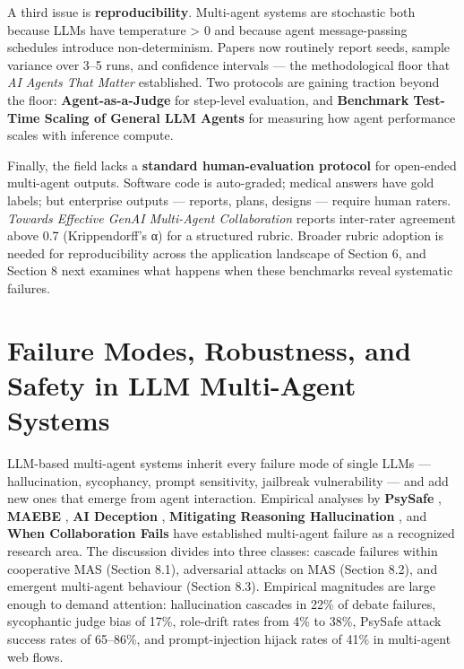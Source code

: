 \documentclass{article}
\begin{document}
A third issue is \textbf{reproducibility}. Multi-agent systems are stochastic both because LLMs have temperature \textgreater{} 0 and because agent message-passing schedules introduce non-determinism. Papers now routinely report seeds, sample variance over 3--5 runs, and confidence intervals --- the methodological floor that \emph{AI Agents That Matter} established. Two protocols are gaining traction beyond the floor: \textbf{Agent-as-a-Judge} for step-level evaluation, and \textbf{Benchmark Test-Time Scaling of General LLM Agents} \citep{li20262026} for measuring how agent performance scales with inference compute.

Finally, the field lacks a \textbf{standard human-evaluation protocol} for open-ended multi-agent outputs. Software code is auto-graded; medical answers have gold labels; but enterprise outputs --- reports, plans, designs --- require human raters. \emph{Towards Effective GenAI Multi-Agent Collaboration} \citep{shu2024towardseffectivege} reports inter-rater agreement above 0.7 (Krippendorff's α) for a structured rubric. Broader rubric adoption is needed for reproducibility across the application landscape of Section 6, and Section 8 next examines what happens when these benchmarks reveal systematic failures.

\section{Failure Modes, Robustness, and Safety in LLM Multi-Agent Systems}\label{failure-modes-robustness-and-safety-in-llm-multi-agent-systems}

LLM-based multi-agent systems inherit every failure mode of single LLMs --- hallucination, sycophancy, prompt sensitivity, jailbreak vulnerability --- and add new ones that emerge from agent interaction. Empirical analyses by \textbf{PsySafe} \citep{zhang2024psysafeacomprehens}, \textbf{MAEBE} \citep{erisken2025maebemultiagenteme}, \textbf{AI Deception} \citep{park2024aideceptionasurvey}, \textbf{Mitigating Reasoning Hallucination} \citep{shi2024mitigatingreasonin}, and \textbf{When Collaboration Fails} \citep{kraidia20262026} have established multi-agent failure as a recognized research area. The discussion divides into three classes: cascade failures within cooperative MAS (Section 8.1), adversarial attacks on MAS (Section 8.2), and emergent multi-agent behaviour (Section 8.3). Empirical magnitudes are large enough to demand attention: hallucination cascades in 22\% of debate failures, sycophantic judge bias of 17\%, role-drift rates from 4\% to 38\%, PsySafe attack success rates of 65--86\%, and prompt-injection hijack rates of 41\% in multi-agent web flows.
\end{document}
